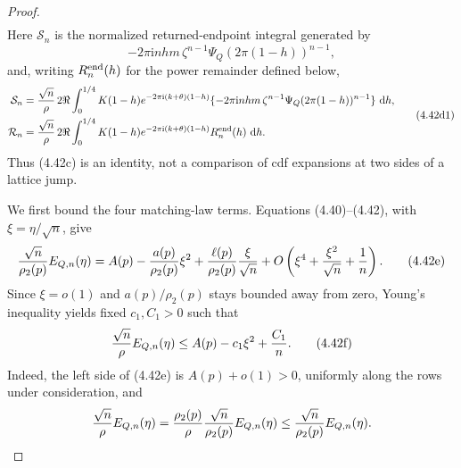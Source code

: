 \documentclass[11pt,a4paper]{article}
\numberwithin{equation}{section}
\theoremstyle{definition}
\theoremstyle{remark}
\newcommand{\ii}{\mathrm i}
\newcommand{\dd}{\,\mathrm d}
\begin{document}
\begin{proof}
\begin{equation}
\begin{split}
\end{split}
\end{equation}
Here $\mathcal S_n$ is the normalized returned-endpoint integral generated
by
\[
 -2\pi\ii nhm\,\zeta^{n-1}
       \Psi_Q(2\pi(1-h))^{n-1},                       \tag{4.42d}
\]
and, writing $R_n^{\rm end}(h)$ for the power remainder defined below,
\[
 \begin{aligned}
 \mathcal S_n&={\sqrt n\over\rho}\,2\Re\int_0^{1/4}K(1-h)
 e^{-2\pi\ii(k+\theta)(1-h)}
 \{-2\pi\ii nhm\,\zeta^{n-1}
       \Psi_Q(2\pi(1-h))^{n-1}\}\,\dd h,\\
 \mathcal R_n&={\sqrt n\over\rho}\,2\Re\int_0^{1/4}K(1-h)
 e^{-2\pi\ii(k+\theta)(1-h)}R_n^{\rm end}(h)\,\dd h.
 \end{aligned}                                             \tag{4.42d1}
\]
Thus
(4.42c) is an identity, not a comparison of cdf expansions at two sides
of a lattice jump.

We first bound the four matching-law terms.  Equations (4.40)--(4.42),
with $\xi=\eta/\sqrt n$, give
\[
 {\sqrt n\over\rho_2(p)}E_{Q,n}(\eta)
 =A(p)-{a(p)\over\rho_2(p)}\xi^2
   +{\ell(p)\over\rho_2(p)}{\xi\over\sqrt n}
   +O\left(\xi^4+{\xi^2\over\sqrt n}+{1\over n}\right).
                                                               \tag{4.42e}
\]
Since $\xi=o(1)$ and $a(p)/\rho_2(p)$ stays bounded away from zero,
Young's inequality yields fixed $c_1,C_1>0$ such that
\[
 {\sqrt n\over\rho}E_{Q,n}(\eta)
 \le A(p)-c_1\xi^2+{C_1\over n}.                     \tag{4.42f}
\]
Indeed, the left side of (4.42e) is $A(p)+o(1)>0$, uniformly along the
rows under consideration, and
\[
 {\sqrt n\over\rho}E_{Q,n}(\eta)
 ={\rho_2(p)\over\rho}
       {\sqrt n\over\rho_2(p)}E_{Q,n}(\eta)
 \le {\sqrt n\over\rho_2(p)}E_{Q,n}(\eta).
\]


\end{proof}
\end{document}
